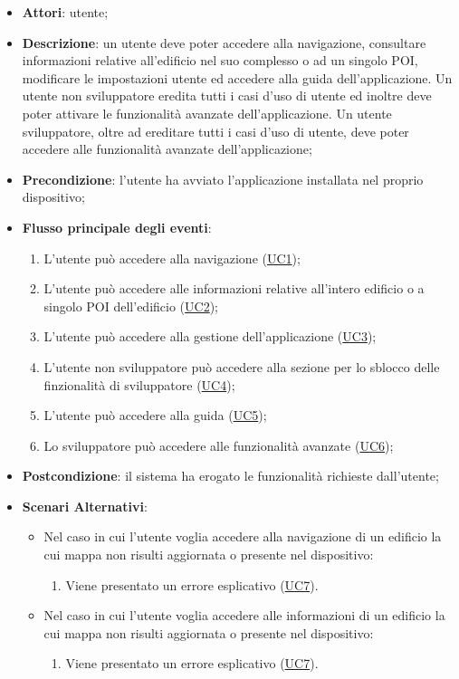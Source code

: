 \documentclass[../AnalisiDeiRequisiti.tex]{subfiles}
\begin{document}
\begin{itemize}
\item \textbf{Attori}: utente;
\item \textbf{Descrizione}: un utente deve poter accedere alla navigazione, consultare informazioni relative all'edificio nel suo complesso o ad un singolo POI, modificare le impostazioni utente ed accedere alla guida dell'applicazione. Un utente non sviluppatore eredita tutti i casi d'uso di utente ed inoltre deve poter attivare le funzionalità avanzate dell'applicazione. Un utente sviluppatore, oltre ad ereditare tutti i casi d'uso di utente, deve poter accedere alle funzionalità avanzate dell'applicazione; 
      \item \textbf{Precondizione}: l'utente ha avviato l'applicazione installata nel proprio dispositivo;

        \item \textbf{Flusso principale degli eventi}:
          \begin{enumerate}
          \item L'utente può accedere alla navigazione (\hyperlink{UC1}{UC1});
          \item L'utente può accedere alle informazioni relative all'intero edificio o a singolo POI dell'edificio (\hyperlink{UC2}{UC2});
          \item L'utente può accedere alla gestione dell'applicazione (\hyperlink{UC3}{UC3});
          \item L'utente non sviluppatore può accedere alla sezione per lo sblocco delle finzionalità di sviluppatore (\hyperlink{UC4}{UC4});
          \item L'utente può accedere alla guida (\hyperlink{UC5}{UC5});
          \item Lo sviluppatore può accedere alle funzionalità avanzate (\hyperlink{UC6}{UC6});

      \end{enumerate}
    \item \textbf{Postcondizione}: il sistema ha erogato le funzionalità richieste dall'utente;
    \item \textbf{Scenari Alternativi}:
      	\begin{itemize}
    			\item Nel caso in cui l'utente voglia accedere alla navigazione di un edificio la cui mappa non risulti aggiornata o presente nel dispositivo:
    			\begin{enumerate}
    				\item Viene presentato un errore esplicativo (\hyperlink{UC7}{UC7}).
    			\end{enumerate}
          \item Nel caso in cui l'utente voglia accedere alle informazioni di un edificio la cui mappa non risulti aggiornata o presente nel dispositivo:
          \begin{enumerate}
            \item Viene presentato un errore esplicativo (\hyperlink{UC7}{UC7}).
          \end{enumerate}
      	\end{itemize}
  \end{itemize}
\hypertarget{UC1}{}
\end{document}
